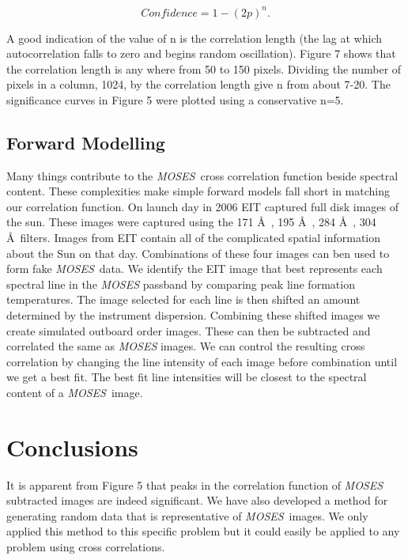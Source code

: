 \documentclass[]{aastex6}
\newcommand{\MOSES}{\textit{MOSES}}
\begin{document}
\begin{equation}
Confidence = 1-(2p)^n.
\end{equation}

A good indication of the value of n is the correlation length (the lag at which autocorrelation falls to zero and begins random oscillation).  Figure 7 shows that the correlation length is any where from 50 to 150 pixels.  Dividing the number of pixels in a column, 1024, by the correlation length give n from about 7-20.  The significance curves in Figure 5 were plotted using a conservative n=5.

\subsection{Forward Modelling}

Many things contribute to the \MOSES \ cross correlation function beside spectral content.  These complexities make simple forward models fall short in matching our correlation function.  On launch day in 2006 EIT captured full disk images of the sun. These images were captured using the 171 \AA \ , 195 \AA \ , 284 \AA \ , 304 \AA \ filters.  Images from EIT contain all of the complicated spatial information about the Sun on that day. Combinations of these four images can ben used to form fake \MOSES \ data.  We identify the EIT image that best represents each spectral line in the \textit{MOSES} passband by comparing peak line formation temperatures. The image selected for each line is then shifted an amount determined by the instrument dispersion.  Combining these shifted images we create simulated outboard order images.  These can then be subtracted and correlated the same as \textit{MOSES} images.  We can control the resulting cross correlation by changing the line intensity of each image before combination until we get a best fit.  The best fit line intensities will be closest to the spectral content of a \MOSES \ image.


\section{Conclusions}
It is apparent from Figure 5 that peaks in the correlation function of \textit{MOSES} subtracted images are indeed significant.  We have also developed a method for generating random data that is representative of \MOSES \ images. We only applied this method to this specific problem but it could easily be applied to any problem using cross correlations.  
\end{document}
